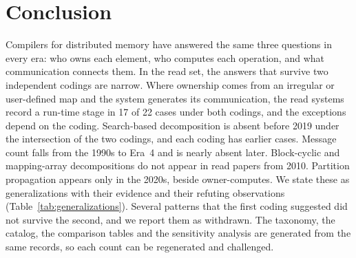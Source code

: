 \section{Conclusion}
\label{sec:conclusion}

Compilers for distributed memory have answered the same three questions in every era: who owns each element, who computes each operation, and what communication connects them. In the read set, the answers that survive two independent codings are narrow. Where ownership comes from an irregular or user-defined map and the system generates its communication, the read systems record a run-time stage in 17 of 22 cases under both codings, and the exceptions depend on the coding. Search-based decomposition is absent before 2019 under the intersection of the two codings, and each coding has earlier cases. Message count falls from the 1990s to Era~4 and is nearly absent later. Block-cyclic and mapping-array decompositions do not appear in read papers from 2010. Partition propagation appears only in the 2020s, beside owner-computes. We state these as generalizations with their evidence and their refuting observations (Table~\ref{tab:generalizations}). Several patterns that the first coding suggested did not survive the second, and we report them as withdrawn. The taxonomy, the catalog, the comparison tables and the sensitivity analysis are generated from the same records, so each count can be regenerated and challenged. 
